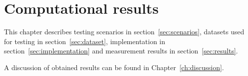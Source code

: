 \chapter{Computational results}\label{ch:computational-results}

This chapter describes testing scenarios in section~\ref{sec:scenarios},
datasets used for testing in section~\ref{sec:dataset},
implementation in section~\ref{sec:implementation} and
measurement results in section~\ref{sec:results}.

A discussion of obtained results can be found in Chapter~\ref{ch:discussion}.





